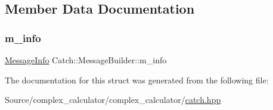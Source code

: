 \subsection{Member Data Documentation}
\mbox{\label{struct_catch_1_1_message_builder_a979f1c2b36d78f80ee275bfa5ba0209f}} 
\subsubsection{\texorpdfstring{m\+\_\+info}{m\_info}}
{\footnotesize\ttfamily \mbox{\hyperlink{struct_catch_1_1_message_info}{Message\+Info}} Catch\+::\+Message\+Builder\+::m\+\_\+info}



The documentation for this struct was generated from the following file\+:\begin{DoxyCompactItemize}
\item 
Source/complex\+\_\+calculator/complex\+\_\+calculator/\mbox{\hyperlink{catch_8hpp}{catch.\+hpp}}\end{DoxyCompactItemize}
